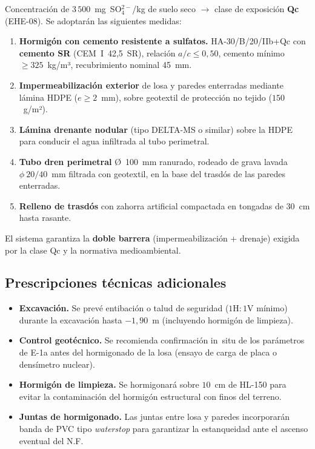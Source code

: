\begin{notabox}
  Concentración de $3\,500$~mg~SO$_4^{2-}$/kg de suelo seco
  $\rightarrow$ clase de exposición \textbf{Qc} (EHE-08).
  Se adoptarán las siguientes medidas:
  \begin{enumerate}
    \item \textbf{Hormigón con cemento resistente a sulfatos.}
          HA-30/B/20/IIb+Qc con \textbf{cemento SR} (CEM~I~42,5~SR),
          relación $a/c\leq0{,}50$, cemento mínimo $\geq325$~kg/m³,
          recubrimiento nominal 45~mm.
    \item \textbf{Impermeabilización exterior} de losa y paredes enterradas
          mediante lámina HDPE ($e\geq2$~mm), sobre geotextil de
          protección no tejido ($150$~g/m²).
    \item \textbf{Lámina drenante nodular} (tipo DELTA-MS o similar) sobre
          la HDPE para conducir el agua infiltrada al tubo perimetral.
    \item \textbf{Tubo dren perimetral} Ø~100~mm ranurado, rodeado de grava
          lavada $\phi~20/40$~mm filtrada con geotextil, en la base del
          trasdós de las paredes enterradas.
    \item \textbf{Relleno de trasdós} con zahorra artificial compactada en
          tongadas de 30~cm hasta rasante.
  \end{enumerate}
  El sistema garantiza la \textbf{doble barrera} (impermeabilización + drenaje)
  exigida por la clase Qc y la normativa medioambiental.
\end{notabox}

\subsection{Prescripciones técnicas adicionales}
\label{subsec:prescripciones_arqueta}

\begin{itemize}
  \item \textbf{Excavación.} Se prevé entibación o talud de seguridad
        ($1\text{H}:1\text{V}$ mínimo) durante la excavación hasta
        $-1{,}90$~m (incluyendo hormigón de limpieza).
  \item \textbf{Control geotécnico.} Se recomienda confirmación in~situ
        de los parámetros de E-1a antes del hormigonado de la losa
        (ensayo de carga de placa o densímetro nuclear).
  \item \textbf{Hormigón de limpieza.} Se hormigonará sobre $10$~cm de
        HL-150 para evitar la contaminación del hormigón estructural
        con finos del terreno.
  \item \textbf{Juntas de hormigonado.} Las juntas entre losa y paredes
        incorporarán banda de PVC tipo \emph{waterstop} para garantizar
        la estanqueidad ante el ascenso eventual del N.F.
\end{itemize}

